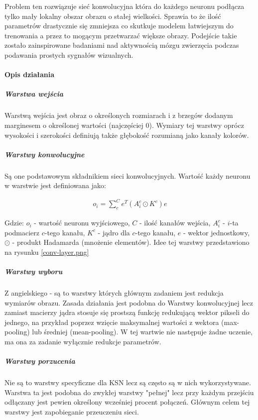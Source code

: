 Problem ten rozwiązuje sieć konwolucyjna która do każdego neuronu podłącza tylko mały lokalny obszar obrazu o stałej wielkości. Sprawia to że ilość parametrów drastycznie się zmniejsza co skutkuje modelem łatwiejszym do trenowania a przez to mogącym przetwarzać większe obrazy. Podejście takie zostało zainspirowane badaniami nad aktywnością mózgu zwierzęcia podczas podawania prostych sygnałów wizualnych.\cite{CNN-cat}
\paragraph{Opis działania}
\subparagraph{Warstwa wejścia} 
Warstwą wejścia jest obraz o określonych rozmiarach i z brzegów dodanym marginesem  o określonej wartości (najczęściej 0). Wymiary tej warstwy oprócz wysokości i szerokości definiują także głębokość rozumianą jako kanały kolorów. \cite{CNN-expl}
\subparagraph{Warstwy konwolucyjne} 
Są one podstawowym składnikiem sieci konwolucyjnych. Wartość każdy neuronu w warstwie jest definiowana jako:

\begin{align*}
	o_i = \sum^C_c e^T(A^c_i \odot K^c)e
\end{align*}

Gdzie: $o_i$ - wartość neuronu wyjściowego, $C$ - ilość kanałów wejścia, $A^c_i$ - $i$-ta podmacierz $c$-tego kanału, $K^c$ - jądro dla $c$-tego kanału, $e$ - wektor jednostkowy, $\odot$ - produkt Hadamarda (mnożenie elementów)\cite{CNN-intro}.
Idee tej warstwy przedstawiono na rysunku \ref{conv-layer.png} \cite{CNN-intro}


\subparagraph{Warstwy wyboru}
Z angielskiego  - są to warstwy których głównym zadaniem jest redukcja wymiarów obrazu. Zasada działania jest podobna do Warstwy konwolucyjnej lecz zamiast macierzy jądra stosuje się prostszą funkcję redukującą wektor pikseli do jednego, na przykład poprzez wzięcie maksymalnej wartości z wektora (max-pooling) lub średniej (mean-pooling). W tej wartwie nie następuje żadne uczenie, ma ona za zadanie wyłącznie redukcje parametrów. \cite{CNN-intro}
\subparagraph{Warstwy porzucenia}
Nie są to warstwy specyficzne dla KSN lecz są często są w nich wykorzystywane. Warstwa ta jest podobna do zwykłej warstwy "pełnej" lecz przy każdym przejściu odłączany jest pewien określony wcześniej procent połączeń. Głównym celem tej warstwy jest zapobieganie przeuczeniu sieci. \cite{CNN-expl}

